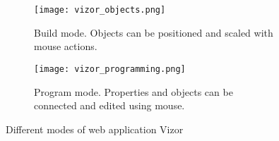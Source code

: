 \begin{figure}
\begin{subfigure}{.5\textwidth}
  \centering
  \texttt{[image: vizor\_objects.png]}
  \caption{Build mode. Objects can be positioned and scaled with mouse actions.}
  \label{fig:vizor:buildmode}
\end{subfigure}%
\begin{subfigure}{.5\textwidth}
  \centering
  \texttt{[image: vizor\_programming.png]}
  \caption{Program mode. Properties and objects can be connected and edited using mouse. }
  \label{fig:vizor:programmode}
\end{subfigure}
\caption{Different modes of web application Vizor}
\label{fig:vizor}
\end{figure}
